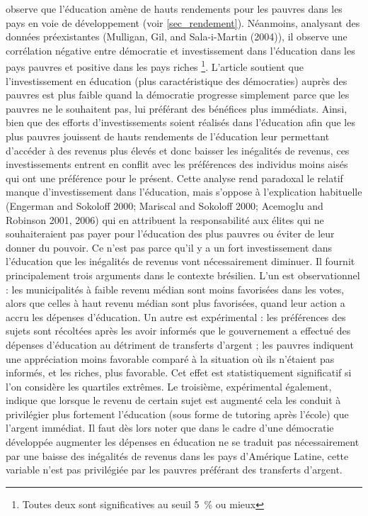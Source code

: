 \documentclass[pagesize, twoside=off, bibliography=totoc, DIV=calc, fontsize=12pt, a4paper, french]{scrartcl}
\begin{document}
 observe que l’éducation amène de hauts rendements pour les pauvres dans les pays en voie de développement (voir \cref{sec_rendement}). Néanmoins, analysant des données préexistantes (Mulligan, Gil, and Sala-i-Martin (2004)), il observe une corrélation négative entre démocratie et investissement dans l’éducation dans les pays pauvres et positive dans les pays riches \footnote{Toutes deux sont significatives au seuil \SI{5}{\percent} ou mieux}. L’article soutient que l’investissement en éducation (plus caractéristique des démocraties) auprès des pauvres est plus faible quand la démocratie progresse simplement parce que les pauvres ne le souhaitent pas, lui préférant des bénéfices plus immédiats. Ainsi, bien que des efforts d’investissements soient réalisés dans l’éducation afin que les plus pauvres jouissent de hauts rendements de l’éducation leur permettant d’accéder à des revenus plus élevés et donc baisser les inégalités de revenus, ces investissements entrent en conflit avec les préférences des individus moins aisés qui ont une préférence pour le présent. Cette analyse rend paradoxal le relatif manque d’investissement dans l’éducation, mais s’oppose à l’explication habituelle (Engerman and Sokoloff 2000; Mariscal and Sokoloff 2000; Acemoglu and Robinson 2001, 2006) qui en attribuent la responsabilité aux élites qui ne souhaiteraient pas payer pour l’éducation des plus pauvres ou éviter de leur donner du pouvoir.  Ce n’est pas parce qu’il y a un fort investissement dans l’éducation que les inégalités de revenus vont nécessairement diminuer. Il fournit principalement trois arguments dans le contexte brésilien. L’un est observationnel : les municipalités à faible revenu médian sont moins favorisées dans les votes, alors que celles à haut revenu médian sont plus favorisées, quand leur action a accru les dépenses d’éducation. Un autre est expérimental : les préférences des sujets sont récoltées après les avoir informés que le gouvernement a effectué des dépenses d’éducation au détriment de transferts d’argent ; les pauvres indiquent une appréciation moins favorable comparé à la situation où ils n’étaient pas informés, et les riches, plus favorable. Cet effet est statistiquement significatif si l’on considère les quartiles extrêmes. Le troisième, expérimental également, indique que lorsque le revenu de certain sujet est augmenté cela les conduit à privilégier plus fortement l’éducation (sous forme de tutoring après l’école) que l’argent immédiat. Il faut dès lors noter que dans le cadre d’une démocratie développée augmenter les dépenses en éducation ne se traduit pas nécessairement par une baisse des inégalités de revenus dans les pays d’Amérique Latine, cette variable n'est pas privilégiée par les pauvres préférant des transferts d’argent.
\end{document}
